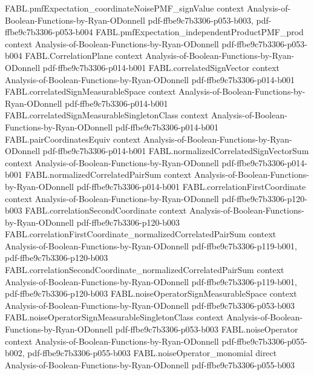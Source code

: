\begin{theorem}
\proofstep
  {FABL.pmfExpectation_coordinateNoisePMF_signValue}
  {context}
  {Analysis-of-Boolean-Functions-by-Ryan-ODonnell}
  {pdf-ffbe9c7b3306-p053-b003,
    pdf-ffbe9c7b3306-p053-b004}
\proofstep
  {FABL.pmfExpectation_independentProductPMF_prod}
  {context}
  {Analysis-of-Boolean-Functions-by-Ryan-ODonnell}
  {pdf-ffbe9c7b3306-p053-b004}
\proofstep
  {FABL.CorrelationPlane}
  {context}
  {Analysis-of-Boolean-Functions-by-Ryan-ODonnell}
  {pdf-ffbe9c7b3306-p014-b001}
\proofstep
  {FABL.correlatedSignVector}
  {context}
  {Analysis-of-Boolean-Functions-by-Ryan-ODonnell}
  {pdf-ffbe9c7b3306-p014-b001}
\proofstep
  {FABL.correlatedSignMeasurableSpace}
  {context}
  {Analysis-of-Boolean-Functions-by-Ryan-ODonnell}
  {pdf-ffbe9c7b3306-p014-b001}
\proofstep
  {FABL.correlatedSignMeasurableSingletonClass}
  {context}
  {Analysis-of-Boolean-Functions-by-Ryan-ODonnell}
  {pdf-ffbe9c7b3306-p014-b001}
\proofstep
  {FABL.pairCoordinatesEquiv}
  {context}
  {Analysis-of-Boolean-Functions-by-Ryan-ODonnell}
  {pdf-ffbe9c7b3306-p014-b001}
\proofstep
  {FABL.normalizedCorrelatedSignVectorSum}
  {context}
  {Analysis-of-Boolean-Functions-by-Ryan-ODonnell}
  {pdf-ffbe9c7b3306-p014-b001}
\proofstep
  {FABL.normalizedCorrelatedPairSum}
  {context}
  {Analysis-of-Boolean-Functions-by-Ryan-ODonnell}
  {pdf-ffbe9c7b3306-p014-b001}
\proofstep
  {FABL.correlationFirstCoordinate}
  {context}
  {Analysis-of-Boolean-Functions-by-Ryan-ODonnell}
  {pdf-ffbe9c7b3306-p120-b003}
\proofstep
  {FABL.correlationSecondCoordinate}
  {context}
  {Analysis-of-Boolean-Functions-by-Ryan-ODonnell}
  {pdf-ffbe9c7b3306-p120-b003}
\proofstep
  {FABL.correlationFirstCoordinate_normalizedCorrelatedPairSum}
  {context}
  {Analysis-of-Boolean-Functions-by-Ryan-ODonnell}
  {pdf-ffbe9c7b3306-p119-b001,
    pdf-ffbe9c7b3306-p120-b003}
\proofstep
  {FABL.correlationSecondCoordinate_normalizedCorrelatedPairSum}
  {context}
  {Analysis-of-Boolean-Functions-by-Ryan-ODonnell}
  {pdf-ffbe9c7b3306-p119-b001,
    pdf-ffbe9c7b3306-p120-b003}
\proofstep
  {FABL.noiseOperatorSignMeasurableSpace}
  {context}
  {Analysis-of-Boolean-Functions-by-Ryan-ODonnell}
  {pdf-ffbe9c7b3306-p053-b003}
\proofstep
  {FABL.noiseOperatorSignMeasurableSingletonClass}
  {context}
  {Analysis-of-Boolean-Functions-by-Ryan-ODonnell}
  {pdf-ffbe9c7b3306-p053-b003}
\proofstep
  {FABL.noiseOperator}
  {context}
  {Analysis-of-Boolean-Functions-by-Ryan-ODonnell}
  {pdf-ffbe9c7b3306-p055-b002,
    pdf-ffbe9c7b3306-p055-b003}
\proofstep
  {FABL.noiseOperator_monomial}
  {direct}
  {Analysis-of-Boolean-Functions-by-Ryan-ODonnell}
  {pdf-ffbe9c7b3306-p055-b003}

\end{theorem}
